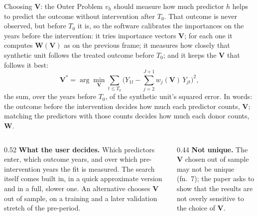 \documentclass[main.tex]{subfiles}
\begin{document}
\begin{frame}{Choosing $\mathbf{V}$: the Outer Problem}
  \small
  $v_h$ should measure how much predictor $h$ helps to predict the outcome
  without intervention after $T_0$. That outcome is never observed, but before
  $T_0$ it is, so the software calibrates the importances on the years before
  the intervention: it tries importance vectors $\mathbf{V}$; for each one it
  computes $\mathbf{W}(\mathbf{V})$ as on the previous frame; it measures how
  closely that synthetic unit follows the treated outcome before $T_0$; and it
  keeps the $\mathbf{V}$ that follows it best:
  \[
    \mathbf{V}^{*} = \arg\min_{\mathbf{V}} \sum_{t \le T_0}
    \Big( Y_{1t} - \sum_{j=2}^{J+1} w_j(\mathbf{V})\, Y_{jt} \Big)^2,
  \]
  the sum, over the years before $T_0$, of the synthetic unit's squared error.
  In words: the outcome before the intervention decides how much each
  predictor counts, $\mathbf{V}$; matching the predictors with those counts
  decides how much each donor counts, $\mathbf{W}$.
  \medskip
  \begin{columns}[T]
    \begin{column}{0.52\textwidth}
      \footnotesize
      \textbf{What the user decides.} Which predictors enter, which outcome
      years, and over which pre-intervention years the fit is measured. The
      search itself comes built in, in a quick approximate version and in a
      full, slower one. An alternative chooses $\mathbf{V}$ out of sample,
      on a training and a later validation stretch of the pre-period.
    \end{column}
    \begin{column}{0.44\textwidth}
      \footnotesize
      \textbf{Not unique.} The $\mathbf{V}$ chosen out of sample may not be
      unique (fn.~7); the paper asks to show that the results are not overly
      sensitive to the choice of $\mathbf{V}$.
    \end{column}
  \end{columns}
\end{frame}
\end{document}
